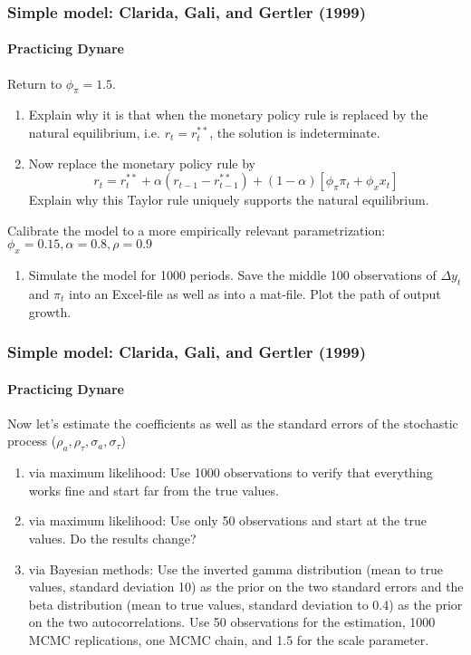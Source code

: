 \documentclass[handout]{beamer}  %
\newcounter{saveenumi}
\newcommand{\seti}{\setcounter{saveenumi}{\value{enumi}}}
\newcommand{\conti}{\setcounter{enumi}{\value{saveenumi}}}
\begin{document}
\begin{frame}\frametitle{Simple model: Clarida, Gali, and Gertler (1999)}\framesubtitle{Practicing Dynare}
Return to $\phi_\pi=1.5$.
\begin{enumerate}\conti
  \item Explain why it is that when the monetary policy rule is replaced by the natural equilibrium, i.e. $r_t =r_t^{**}$, the solution is indeterminate.
  \item Now replace the monetary policy rule by
  \begin{equation*} r_{t} = r_t^{**} + \alpha (r_{t-1}-r^{**}_{t-1})+(1-\alpha )\left[ \phi _{\pi }\pi _{t}+\phi _{x}x_{t}\right]\end{equation*}
  Explain why this Taylor rule uniquely supports the natural equilibrium.\seti
\end{enumerate}
Calibrate the model to a more empirically relevant parametrization: $\phi_x=0.15,\alpha=0.8,\rho=0.9$
\begin{enumerate}\conti
   \item Simulate the model for 1000 periods. Save the middle 100 observations of $\Delta y_t$ and $\pi_t$ into an Excel-file as well as into a mat-file. Plot the path of output growth.
\seti\end{enumerate}
\end{frame}

\begin{frame}\frametitle{Simple model: Clarida, Gali, and Gertler (1999)}\framesubtitle{Practicing Dynare}
Now let's estimate the coefficients as well as the standard errors of the stochastic process ($\rho_a,\rho_\tau,\sigma_a,\sigma_\tau$)
\begin{enumerate}\conti
  \item via maximum likelihood: Use 1000 observations to verify that everything works fine and start far from the true values.
  \item via maximum likelihood: Use only 50 observations and start at the true values. Do the results change?
  \item via Bayesian methods: Use the inverted gamma distribution (mean to true values, standard deviation 10) as the prior on the two standard errors and the beta distribution (mean to true values, standard deviation to 0.4) as the prior on the two autocorrelations. Use 50 observations for the estimation, 1000 MCMC replications, one MCMC chain, and 1.5 for the scale parameter.
\end{enumerate}
\end{frame}
\end{document}
